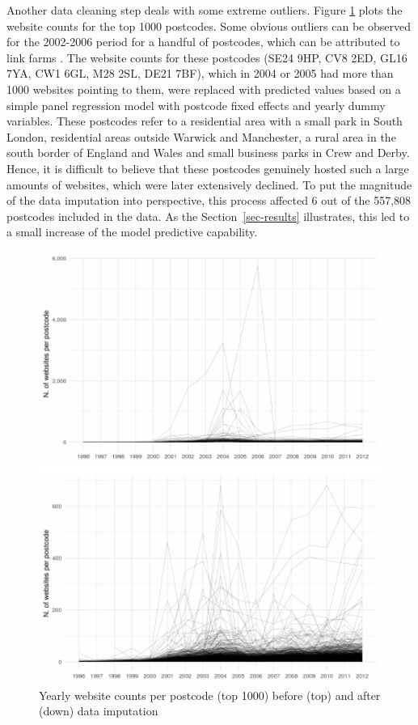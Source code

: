 \documentclass[
  authoryear,
  preprint,
  3p]{elsarticle}
\begin{document}
Another data cleaning step deals with some extreme outliers. Figure
\ref{correct} plots the website counts for the top 1000 postcodes. Some
obvious outliers can be observed for the 2002-2006 period for a handful
of postcodes, which can be attributed to link farms \citep{BL2013links}.
The website counts for these postcodes (SE24 9HP, CV8 2ED, GL16 7YA, CW1
6GL, M28 2SL, DE21 7BF), which in 2004 or 2005 had more than 1000
websites pointing to them, were replaced with predicted values based on
a simple panel regression model with postcode fixed effects and yearly
dummy variables. These postcodes refer to a residential area with a
small park in South London, residential areas outside Warwick and
Manchester, a rural area in the south border of England and Wales and
small business parks in Crew and Derby. Hence, it is difficult to
believe that these postcodes genuinely hosted such a large amounts of
websites, which were later extensively declined. To put the magnitude of
the data imputation into perspective, this process affected 6 out of the
557,808 postcodes included in the data. As the Section~\ref{sec-results}
illustrates, this led to a small increase of the model predictive
capability.

\begin{figure}[H]

{\centering \includegraphics[width=1\textwidth,height=0.7\textheight]{tranos2023_files/figure-pdf/unnamed-chunk-2-1.pdf}

}

\caption{\label{correct}Yearly website counts per postcode (top 1000)
before (top) and after (down) data imputation}

\end{figure}%
\end{document}
